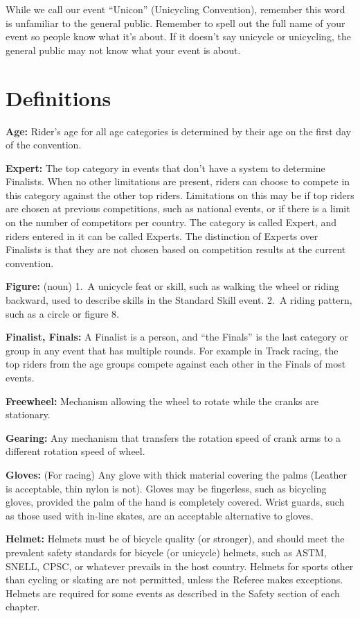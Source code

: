 While we call our event ``Unicon'' (Unicycling Convention), remember this word is unfamiliar to the general public.
Remember to spell out the full name of your event so people know what it's about.
If it doesn't say unicycle or unicycling, the general public may not know what your event is about.

\section{Definitions \label{chap:general_definitions}}

\textbf{Age:} Rider's age for all age categories is determined by their age on the first day of the convention.

\textbf{Expert:} The top category in events that don't have a system to determine Finalists.
When no other limitations are present, riders can choose to compete in this category against the other top riders.
Limitations on this may be if top riders are chosen at previous competitions, such as national events, or if there is a limit on the number of competitors per country.
The category is called Expert, and riders entered in it can be called Experts.
The distinction of Experts over Finalists is that they are not chosen based on competition results at the current convention.

\textbf{Figure:} (noun) 1.~A unicycle feat or skill, such as walking the wheel or riding backward, used to describe skills in the Standard Skill event.
2.~A riding pattern, such as a circle or figure 8.

\textbf{Finalist, Finals:} A Finalist is a person, and ``the Finals'' is the last category or group in any event that has multiple rounds.
For example in Track racing, the top riders from the age groups compete against each other in the Finals of most events.

\textbf{Freewheel:} Mechanism allowing the wheel to rotate while the cranks are stationary.

\textbf{Gearing:} Any mechanism that transfers the rotation speed of crank arms to a different rotation speed of wheel.

\textbf{Gloves:} (For racing) Any glove with thick material covering the palms (Leather is acceptable, thin nylon is not).
Gloves may be fingerless, such as bicycling gloves, provided the palm of the hand is completely covered.
Wrist guards, such as those used with in-line skates, are an acceptable alternative to gloves.

\textbf{Helmet:} Helmets must be of bicycle quality (or stronger), and should meet the prevalent safety standards for bicycle (or unicycle) helmets, such as ASTM, SNELL, CPSC, or whatever prevails in the host country.
Helmets for sports other than cycling or skating are not permitted, unless the Referee makes exceptions.
Helmets are required for some events as described in the Safety section of each chapter.

